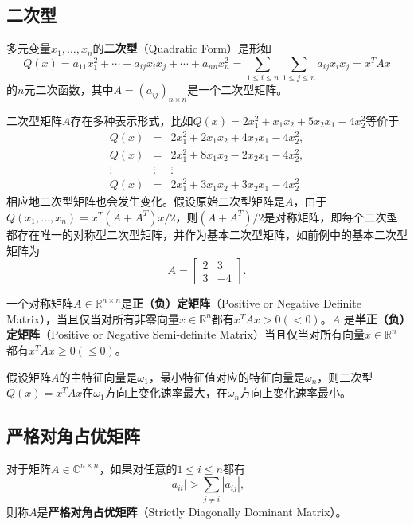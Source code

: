 \subsection{二次型}
\begin{definition}
多元变量$x_1,\ldots,x_n$的\textbf{二次型}（Quadratic Form）是形如
\begin{equation}
    Q(x) = a_{11} x_1^2 +\cdots + a_{ij} x_i x_j + \cdots + a_{nn} x_n^2 = \sum\limits_{1\le i\le n}\sum\limits_{1\le j \le n} a_{ij} x_i x_j = x^T A x
\end{equation}
的$n$元二次函数，其中$A=(a_{ij})_{n\times n}$是一个二次型矩阵。
\end{definition}

二次型矩阵$A$存在多种表示形式，比如$Q(x)=2x_1^2 + x_1x_2 + 5 x_2 x_1 - 4 x_2^2$等价于
\[
    \begin{array}{lcl}
        Q(x) & = & 2x_1^2 + 2x_1x_2 + 4 x_2 x_1 - 4 x_2^2,\\
        Q(x) & = & 2x_1^2 + 8x_1x_2 - 2x_2 x_1 - 4 x_2^2,\\
        \vdots & \vdots & \vdots\\
        Q(x) & = & 2x_1^2 + 3x_1x_2 + 3 x_2 x_1 - 4 x_2^2
    \end{array}
\]
相应地二次型矩阵也会发生变化。假设原始二次型矩阵是$A$，由于$Q(x_1,\ldots, x_n)=x^T (A + A^T) x/2$，则$(A + A^T) /2$是对称矩阵，即每个二次型都存在唯一的对称型二次型矩阵，并作为基本二次型矩阵，如前例中的基本二次型矩阵为
\[
    A =
    \begin{bmatrix}
        2 & 3\\
        3 & -4
    \end{bmatrix}.
\]

\begin{definition}
一个对称矩阵$A\in \mathbb R^{n\times n}$是\textbf{正（负）定矩阵}（Positive or Negative Definite Matrix），当且仅当对所有非零向量$x\in \mathbb R^n$都有$x^T A x>0 (<0)$。$A$ 是\textbf{半正（负）定矩阵}（Positive or Negative Semi-definite Matrix）当且仅当对所有向量$x\in \mathbb R^n$都有$x^T A x \ge 0(\le 0)$。
\end{definition}

\begin{proposition}
假设矩阵$A$的主特征向量是$\omega_1$，最小特征值对应的特征向量是$\omega_n$，则二次型$Q(x)=x^T A x$在$\omega_1$方向上变化速率最大，在$\omega_n$方向上变化速率最小。
\end{proposition}


\subsection{严格对角占优矩阵}
\begin{definition}[严格对角占优矩阵]
对于矩阵$A\in \mathbb C^{n\times n}$，如果对任意的$1\le i\le n$都有
\begin{equation}
    |a_{ii}| > \sum\limits_{j\ne i} |a_{ij}|,
\end{equation}
则称$A$是\textbf{严格对角占优矩阵}（Strictly Diagonally Dominant Matrix）。
\end{definition}

